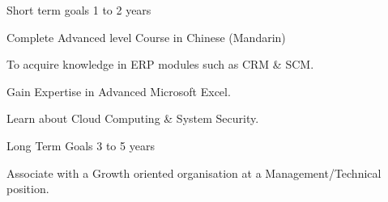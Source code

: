 


\begin{cventries}


\cventry
{Short term goals} %
{ } %
{ } %
{1 to 2 years} %
{ %
\begin{cvitems}
\item {Complete Advanced level Course in Chinese (Mandarin)}
\item{To acquire knowledge in ERP modules such as CRM \& SCM.}
\item{Gain Expertise in Advanced Microsoft Excel.}
\item{Learn about Cloud Computing \& System Security.}
\end{cvitems}
\vspace{-1.5\baselineskip} 
}


\cventry
{Long Term Goals} %
{ } %
{ } %
{3 to 5 years} %
{ %
\begin{cvitems}
\item {Associate with a Growth oriented organisation at a Management/Technical position.}
\end{cvitems}
\vspace{-1.2\baselineskip} 
}


\end{cventries}
\vspace{-0.5\baselineskip} 
